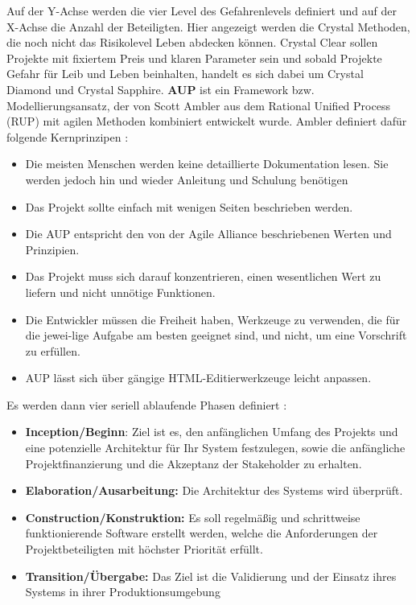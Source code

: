 Auf der Y-Achse werden die vier Level des Gefahrenlevels definiert und auf der X-Achse die Anzahl der Beteiligten. 
Hier angezeigt werden die Crystal Methoden, die noch nicht das Risikolevel Leben abdecken können. 
Crystal Clear sollen Projekte mit fixiertem Preis und klaren Parameter sein und sobald Projekte Gefahr für Leib 
und Leben beinhalten, handelt es sich dabei um Crystal Diamond und Crystal Sapphire.\cite{cockburn2004,Ibrahim2020-ip}
\newline
\textbf{AUP} ist ein Framework bzw. Modellierungsansatz, der von Scott Ambler aus dem Rational Unified Process (RUP) mit agilen Methoden kombiniert entwickelt wurde. 
Ambler definiert dafür folgende Kernprinzipen \cite{Christou2010-vf}:
\begin{itemize}
    \item Die meisten Menschen werden keine detaillierte Dokumentation lesen.  Sie werden jedoch hin und wieder Anleitung und Schulung benötigen
    \item Das Projekt sollte einfach mit wenigen Seiten beschrieben werden.
    \item Die AUP entspricht den von der Agile Alliance beschriebenen Werten und Prinzipien.    
    \item Das Projekt muss sich darauf konzentrieren, einen wesentlichen Wert zu liefern und nicht unnötige Funktionen.
    \item Die Entwickler müssen die Freiheit haben, Werkzeuge zu verwenden, die für die jewei-lige Aufgabe am besten geeignet sind, und nicht, um eine Vorschrift zu erfüllen.
    \item AUP lässt sich über gängige HTML-Editierwerkzeuge leicht anpassen. 
\end{itemize}
Es werden dann vier seriell ablaufende Phasen definiert \cite{Li2010-ge,ShuiYuan2009-or}:
\begin{itemize}
    \item \textbf{Inception/Beginn}: Ziel ist es, den anfänglichen Umfang des Projekts und eine potenzielle Architektur für Ihr System festzulegen, sowie die anfängliche Projektfinanzierung und die Akzeptanz der Stakeholder zu erhalten.
    \item \textbf{Elaboration/Ausarbeitung:} Die Architektur des Systems wird überprüft.
    \item \textbf{Construction/Konstruktion: }Es soll regelmäßig und schrittweise funktionierende Software erstellt werden, welche die Anforderungen der Projektbeteiligten mit höchster Priorität erfüllt.
    \item \textbf{Transition/Übergabe:} Das Ziel ist die Validierung und der Einsatz ihres Systems in ihrer Produktionsumgebung
\end{itemize}

